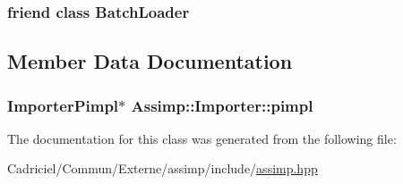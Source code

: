 \hypertarget{class_assimp_1_1_importer_a5fea0896b948727f91147b236db38086}{
\subsubsection[{Batch\-Loader}]{\setlength{\rightskip}{0pt plus 5cm}friend class Batch\-Loader\hspace{0.3cm}{\ttfamily [friend]}}}\label{class_assimp_1_1_importer_a5fea0896b948727f91147b236db38086}


\subsection{Member Data Documentation}
\hypertarget{class_assimp_1_1_importer_a3928bb8d375fd676dd5dbe33382e46ce}{
\subsubsection[{pimpl}]{\setlength{\rightskip}{0pt plus 5cm}Importer\-Pimpl$\ast$ Assimp\-::\-Importer\-::pimpl\hspace{0.3cm}{\ttfamily [protected]}}}\label{class_assimp_1_1_importer_a3928bb8d375fd676dd5dbe33382e46ce}


The documentation for this class was generated from the following file\-:\begin{DoxyCompactItemize}
\item 
Cadriciel/\-Commun/\-Externe/assimp/include/\hyperlink{assimp_8hpp}{assimp.\-hpp}\end{DoxyCompactItemize}
